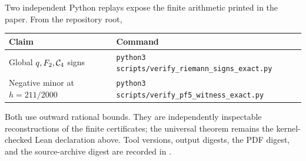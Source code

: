 Two independent Python replays expose the finite arithmetic printed in the
paper. From the repository root,
\begin{center}
\begin{tabular}{@{}ll@{}}
\toprule
Claim & Command \\
\midrule
Global \(q,F_2,\mathcal{C}_4\) signs &
\texttt{python3 scripts/verify\_riemann\_signs\_exact.py} \\
Negative minor at \(h=211/2000\) &
\texttt{python3 scripts/verify\_pf5\_witness\_exact.py} \\
\bottomrule
\end{tabular}
\end{center}
Both use outward rational bounds. They are independently inspectable
reconstructions of the finite certificates; the universal theorem remains the
kernel-checked Lean declaration above. Tool versions, output digests, the PDF
digest, and the source-archive digest are recorded in
.
